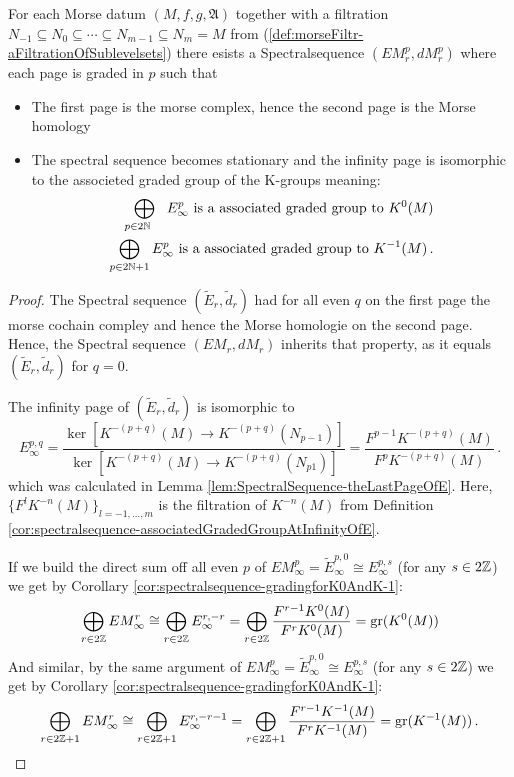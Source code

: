 \begin{theorem}
	For each Morse datum $(M,f,g,\mathfrak{A})$ together with a filtration $N_{-1}\subseteq N_0 \subseteq \cdots \subseteq N_{m-1} \subseteq N_m=M$ from (\ref{def:morseFiltr-aFiltrationOfSublevelsets}) there esists a Spectralsequence $(EM^p_r,dM^p_r)$ where each page is graded in $p$ such that
	\begin{itemize}
		\item The first page is the morse complex, hence the second page is the Morse homology
		\item The spectral sequence becomes stationary and the infinity page is isomorphic to the associeted graded group of the K-groups meaning:
		\begin{align*}
			\bigoplus_{p\in 2\mathbb{N}\phantom{+1}} E_\infty ^p \text{ is a associated graded group to }K^0(M) \\
			\bigoplus_{p\in 2\mathbb{N}+1} E_\infty ^p \text{ is a associated graded group to }K^{-1}(M)\,.
		\end{align*}
	\end{itemize}
	\end{theorem}
	\begin{proof}
		The Spectral sequence $ (\tilde{E}_r,\tilde{d}_r)$ had for all even $q$ on the first page the morse cochain compley and hence the Morse homologie on the second page. Hence, the Spectral sequence $(EM_r,dM_r)$ inherits that property, as it equals $(\tilde{E}_r,\tilde{d}_r)$ for $q=0$. 
		
		The infinity page of $ (\tilde{E}_r,\tilde{d}_r)$ is isomorphic to 
		\begin{equation*}
		E_{\infty}^{p,q}=\frac{\ker[K^{-(p+q)}(M)\to K^{-(p+q)}(N_{p-1})]}{\ker[K^{-(p+q)}(M)\to K^{-(p+q)}(N_{p1})]}=\frac{F^{p-1}K^{-(p+q)}(M)}{F^pK^{-(p+q)}(M)}\,.
	\end{equation*} which was calculated in Lemma \ref{lem:SpectralSequence-theLastPageOfE}. 
	Here, $\{F^lK^{-n}(M)\}_{l=-1,\dots,m}$ is the filtration of $K^{-n}(M)  $ from Definition \ref{cor:spectralsequence-associatedGradedGroupAtInfinityOfE}.

	If we build the direct sum off all even $p$ of $EM^p_{\infty}=\tilde{E}^{p,0}_{\infty}\cong E^{p,s}_{\infty}$ (for any $s\in 2\mathbb{Z}$) we get by Corollary \ref{cor:spectralsequence-gradingforK0AndK-1}:
	\begin{equation*}
		\bigoplus_{r\in2\mathbb{Z}}EM^{r}_{\infty} \cong \bigoplus_{r\in 2\mathbb{Z}}E^{r,-r}_{\infty}=\bigoplus_{r\in 2\mathbb{Z}}\frac{F^{r-1}K^{0}(M)}{F^rK^{0}(M)}=\mathrm{gr}(K^0(M))
	\end{equation*} And similar, by the same argument of $EM^p_{\infty}=\tilde{E}^{p,0}_{\infty}\cong E^{p,s}_{\infty}$ (for any $s\in 2\mathbb{Z}$) we get by Corollary \ref{cor:spectralsequence-gradingforK0AndK-1}:
	\begin{equation*}
		\bigoplus_{r\in2\mathbb{Z}+1}EM^{r}_{\infty} \cong \bigoplus_{r\in 2\mathbb{Z}+1}E^{r,-r-1}_{\infty}=\bigoplus_{r\in 2\mathbb{Z}+1}\frac{F^{r-1}K^{-1}(M)}{F^rK^{-1}(M)}=\mathrm{gr}(K^{-1}(M))\,.
	\end{equation*}
	\end{proof}
